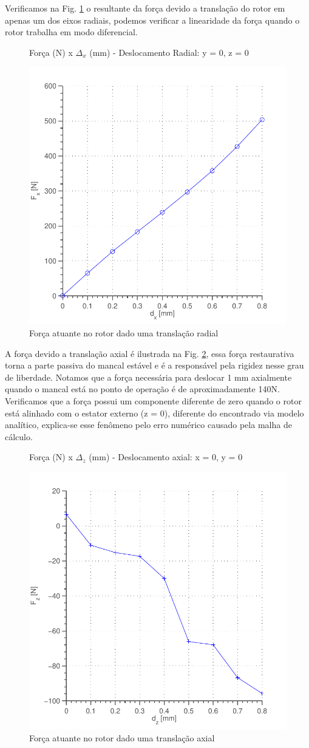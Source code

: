 Verificamos na Fig. \ref{fig:forca:passivo:otimizado:fem:dx} o resultante  da força devido a  translação do rotor em apenas um dos eixos radiais, podemos verificar a linearidade da força quando o rotor trabalha em modo diferencial.  

\begin{figure}[!ht]
\centering
\caption*{Força (N) x $\Delta_x$ (mm) - Deslocamento Radial: y = 0, z = 0}
\includegraphics[width=0.6 \columnwidth,angle=0]{Figs/Simulacoes/Passivo2/fem/passivo_otimizado_fem_dx}
\caption{Força atuante no rotor dado uma translação radial}
\label{fig:forca:passivo:otimizado:fem:dx}
\end{figure} 

A força devido a translação axial é ilustrada na Fig. \ref{fig:forca:passivo:otimizado:fem:dy}, essa força restaurativa torna a parte passiva do mancal estável e é a responsável pela rigidez nesse grau de liberdade. Notamos que a força necessária para deslocar 1 mm axialmente quando o mancal está no ponto de operação é de aproximadamente 140N. Verificamos que a força possui um componente diferente de zero quando o rotor está alinhado com o estator externo (z = 0), diferente do encontrado via  modelo analítico, explica-se esse fenômeno pelo erro numérico causado pela malha de cálculo.

\begin{figure}[!ht]
	\centering
	\caption*{Força (N) x $\Delta_z$ (mm) - Deslocamento axial: x = 0, y = 0}
	\includegraphics[width=0.6 \columnwidth,angle=0]{Figs/Simulacoes/Passivo2/fem/passivo_otimizado_fem_dy}
	\caption{Força atuante no rotor dado uma translação axial}
	\label{fig:forca:passivo:otimizado:fem:dy}
\end{figure}

